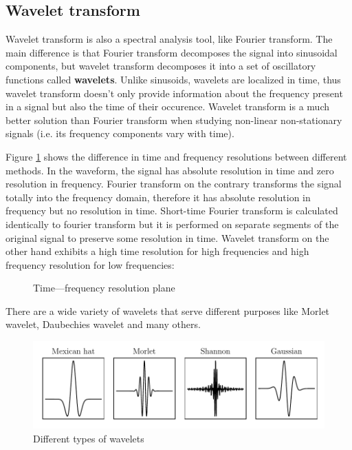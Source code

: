 \subsection{Wavelet transform}
Wavelet transform is also a spectral analysis tool, like Fourier transform. The main difference is that Fourier transform decomposes the signal into sinusoidal components, but wavelet transform decomposes it into a set of oscillatory functions called \textbf{wavelets}. Unlike sinusoids, wavelets are localized in time, thus wavelet transform doesn't only provide information about the frequency present in a signal but also the time of their occurence. Wavelet transform is a much better solution than Fourier transform when studying non-linear non-stationary signals (i.e. its frequency components vary with time).

Figure \ref{fig:time-frequency-plane} shows the difference in time and frequency resolutions between different methods. In the waveform, the signal has absolute resolution in time and zero resolution in frequency. Fourier transform on the contrary transforms the signal totally into the frequency domain, therefore it has absolute resolution in frequency but no resolution in time. Short-time Fourier transform is calculated identically to fourier transform but it is performed on separate segments of the original signal to preserve some resolution in time. Wavelet transform on the other hand exhibits a high time resolution for high frequencies and high frequency resolution for low frequencies:

\begin{figure}[H]
    \centering
    
    \caption{Time—frequency resolution plane}
    \label{fig:time-frequency-plane}
\end{figure}

There are a wide variety of wavelets that serve different purposes like Morlet wavelet, Daubechies wavelet and many others.

\begin{figure}[H]
    \centering
    \includegraphics{figures/wavelets.pdf}
    \caption{Different types of wavelets}
    \label{fig:wavelets}
\end{figure}

